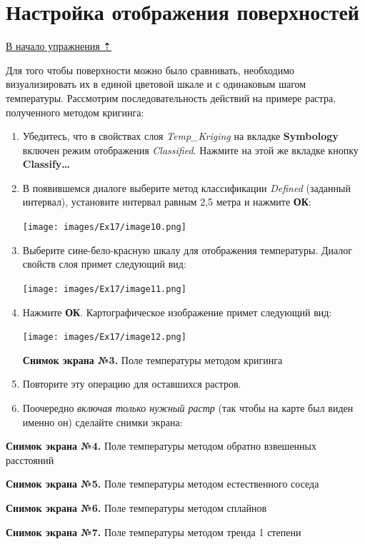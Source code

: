 \documentclass[12pt,]{book}
\begin{document}
\hypertarget{interpolation-visualization}{%
\section{Настройка отображения поверхностей}\label{interpolation-visualization}}

\protect\hyperlink{interpolation}{В начало упражнения ⇡}

Для того чтобы поверхности можно было сравнивать, необходимо визуализировать их в единой цветовой шкале и с одинаковым шагом температуры. Рассмотрим последовательность действий на примере растра, полученного методом кригинга:

\begin{enumerate}
\def\labelenumi{\arabic{enumi}.}
\item
  Убедитесь, что в свойствах слоя \emph{Temp\_Kriging} на вкладке \textbf{Symbology} включен режим отображения \emph{Classified}. Нажмите на этой же вкладке кнопку \textbf{Classify\ldots{}}
\item
  В появившемся диалоге выберите метод классификации \emph{Defined} (заданный интервал), установите интервал равным 2,5 метра и нажмите \textbf{ОК}:

  \texttt{[image: images/Ex17/image10.png]}
\item
  Выберите сине-бело-красную шкалу для отображения температуры. Диалог свойств слоя примет следующий вид:

  \texttt{[image: images/Ex17/image11.png]}
\item
  Нажмите \textbf{ОК}. Картографическое изображение примет следующий вид:

  \texttt{[image: images/Ex17/image12.png]}

  \textbf{Снимок экрана №3.} Поле температуры методом кригинга
\item
  Повторите эту операцию для оставшихся растров.
\item
  Поочередно \emph{включая только нужный растр} (так чтобы на карте был виден именно он) сделайте снимки экрана:
\end{enumerate}

\textbf{Снимок экрана №4.} Поле температуры методом обратно взвешенных расстояний

\textbf{Снимок экрана №5.} Поле температуры методом естественного соседа

\textbf{Снимок экрана №6.} Поле температуры методом сплайнов

\textbf{Снимок экрана №7.} Поле температуры методом тренда 1 степени
\end{document}
